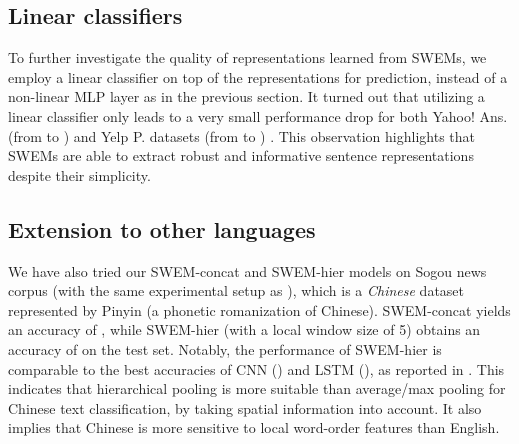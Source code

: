 \documentclass[11pt,a4paper]{article}
\begin{document}
\subsection{Linear classifiers}
\vspace{-1mm}
To further investigate the quality of representations learned from SWEMs, we employ a linear classifier on top of the representations for prediction, instead of a non-linear MLP layer as in the previous section. It turned out that utilizing a linear classifier only leads to a very small performance drop for both Yahoo! Ans. (from  to ) and Yelp P. datasets (from  to ) . This observation highlights that SWEMs are able to extract robust and informative sentence representations despite their simplicity.

\subsection{Extension to other languages}
\vspace{-1mm}
We have also tried our SWEM-concat and SWEM-hier models on Sogou news corpus (with the same experimental setup as \cite{zhang2015character}), which is a \emph{Chinese} dataset represented by Pinyin (a phonetic romanization of Chinese). SWEM-concat yields an accuracy of , while SWEM-hier (with a local window size of 5) obtains an accuracy of  on the test set. Notably, the performance of SWEM-hier is comparable to the best accuracies of CNN () and LSTM (), as reported in \cite{zhang2015character}. This indicates that hierarchical pooling is more suitable than average/max pooling for Chinese text classification, by taking spatial information into account. It also implies that Chinese is more sensitive to local word-order features than English.

\vspace{-1mm}
\end{document}
